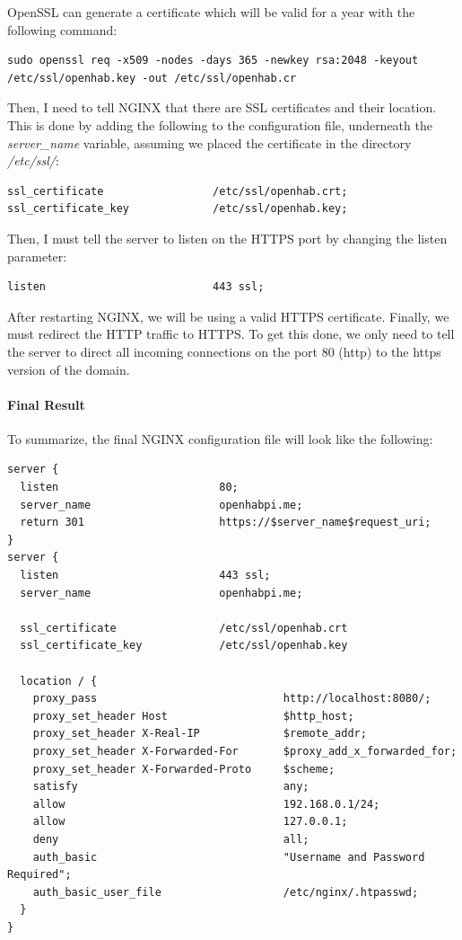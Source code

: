 OpenSSL can generate a certificate which will be valid for a year with the following command:

\begin{lstlisting}[style=Consola]
sudo openssl req -x509 -nodes -days 365 -newkey rsa:2048 -keyout /etc/ssl/openhab.key -out /etc/ssl/openhab.cr
\end{lstlisting}

Then, I need to tell NGINX that there are SSL certificates and their location. This is done by adding the following to the
configuration file, underneath the \textit{server\_name} variable, assuming we placed the certificate in the directory \textit{/etc/ssl/}:

\begin{lstlisting}[style=Consola]
ssl_certificate                 /etc/ssl/openhab.crt;
ssl_certificate_key             /etc/ssl/openhab.key;
\end{lstlisting}

Then, I must tell the server to listen on the HTTPS port by changing the listen parameter:

\begin{lstlisting}[style=Consola]
listen                          443 ssl;
\end{lstlisting}

After restarting NGINX, we will be using a valid HTTPS certificate. Finally, we must redirect the HTTP traffic to HTTPS. To get this
done, we only need to tell the server to direct all incoming connections on the port 80 (http) to the https version of the domain.

\paragraph{Final Result}
To summarize, the final NGINX configuration file will look like the following:

\begin{lstlisting}[style=Consola]
server {
  listen                         80;
  server_name                    openhabpi.me;
  return 301                     https://$server_name$request_uri;
}
server {
  listen                         443 ssl;
  server_name                    openhabpi.me;

  ssl_certificate                /etc/ssl/openhab.crt
  ssl_certificate_key            /etc/ssl/openhab.key

  location / {
    proxy_pass                             http://localhost:8080/;
    proxy_set_header Host                  $http_host;
    proxy_set_header X-Real-IP             $remote_addr;
    proxy_set_header X-Forwarded-For       $proxy_add_x_forwarded_for;
    proxy_set_header X-Forwarded-Proto     $scheme;
    satisfy                                any;
    allow                                  192.168.0.1/24;
    allow                                  127.0.0.1;
    deny                                   all;
    auth_basic                             "Username and Password Required";
    auth_basic_user_file                   /etc/nginx/.htpasswd;
  }
}
\end{lstlisting}

